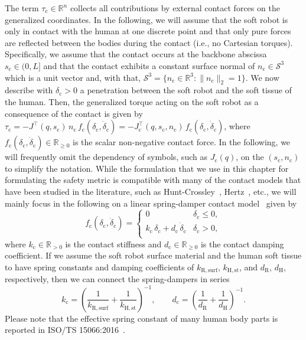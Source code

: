 The term $\tau_\mathrm{c} \in \mathbb{R}^n$ collects all contributions by external contact forces on the generalized coordinates.
In the following, we will assume that the soft robot is only in contact with the human at one discrete point and that only pure forces are reflected between the bodies during the contact (i.e., no Cartesian torques).
Specifically, we assume that the contact occurs at the backbone abscissa $s_\mathrm{c} \in (0, L]$ and that the contact exhibits a constant surface normal of $n_\mathrm{c} \in \mathcal{S}^3$ which is a unit vector and, with that, $\mathcal{S}^3 = \{ n_\mathrm{c} \in \mathbb{R}^3: \lVert n_\mathrm{c} \rVert_2 = 1 \}$.
We now describe with $\delta_\mathrm{c} > 0$ a penetration between the soft robot and the soft tissue of the human.
Then, the generalized torque acting on the soft robot as a consequence of the contact is given by $\tau_\mathrm{c} = -J^\top(q,s_\mathrm{c}) \, n_\mathrm{c} \, f_\mathrm{c}(\delta_\mathrm{c}, \dot{\delta}_\mathrm{c}) = -J_\mathrm{c}^\top(q, s_\mathrm{c}, n_\mathrm{c}) \, f_\mathrm{c}(\delta_\mathrm{c}, \dot{\delta}_\mathrm{c})$, where $f_\mathrm{c}(\delta_\mathrm{c}, \dot{\delta}_\mathrm{c}) \in \mathbb{R}_{\geq 0}$ is the scalar non-negative contact force.
In the following, we will frequently omit the dependency of symbols, such as $J_\mathrm{c}(q)$, on the $(s_\mathrm{c}, n_\mathrm{c})$ to simplify the notation.
While the formulation that we use in this chapter for formulating the safety metric is compatible with many of the contact models that have been studied in the literature, such as Hunt-Crossley~\citep{hunt1975coefficient, aouaj2021predicting}, Hertz~\citep{johnson1987contact, park2011designing, she2020comparative}, etc., we will mainly focus in the following on a linear spring-damper contact model~\citep{iso2016collaborative, haddadin2009requirements} given by
\begin{equation}
    f_\mathrm{c}(\delta_\mathrm{c}, \dot{\delta}_\mathrm{c}) =
    \begin{cases}
        0 & \delta_\mathrm{c} \leq 0,\\
        k_\mathrm{c} \, \delta_\mathrm{c} + d_\mathrm{c} \, \dot{\delta}_\mathrm{c} & \delta_\mathrm{c} > 0,\\
    \end{cases}
\end{equation}
where $k_\mathrm{c} \in \mathbb{R}_{>0}$ is the contact stiffness and $d_\mathrm{c} \in \mathbb{R}_{\geq 0}$ is the contact damping coefficient.
If we assume the soft robot surface material and the human soft tissue to have spring constants and damping coefficients of $k_\mathrm{R,surf}$, $k_\mathrm{H,st}$, and $d_\mathrm{R}$, $d_\mathrm{H}$, respectively, then we can connect the spring-dampers in series
\begin{equation}
    k_\mathrm{c} = \left (\frac{1}{k_\mathrm{R,surf}} + \frac{1}{k_\mathrm{H,st}} \right )^{-1},
    \qquad
    d_\mathrm{c} = \left (\frac{1}{d_\mathrm{R}} + \frac{1}{d_\mathrm{H}} \right )^{-1}.
\end{equation}
Please note that the effective spring constant of many human body parts is reported in ISO/TS 15066:2016~\citep{iso2016collaborative}.

